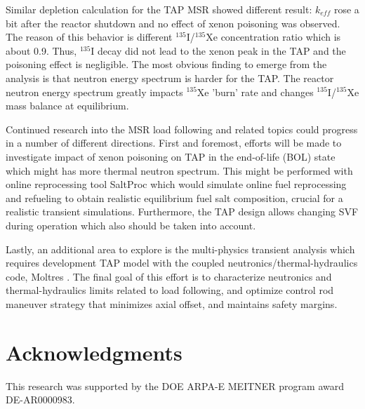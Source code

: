 \documentclass{anstrans}
\begin{document}
Similar depletion calculation for the \gls{TAP} \gls{MSR} showed different 
result: $k_{eff}$ rose a bit after the reactor shutdown and no effect of xenon 
poisoning was observed. The reason of this behavior is different 
$^{135}$I/$^{135}$Xe concentration ratio which is about 0.9. Thus, $^{135}$I 
decay did not lead to the xenon peak in the \gls{TAP} and the poisoning effect 
is negligible. The most obvious finding to emerge from the analysis is that 
neutron energy spectrum is harder for the \gls{TAP}. The reactor neutron energy
spectrum greatly impacts $^{135}$Xe 'burn' rate and changes 
$^{135}$I/$^{135}$Xe mass balance at equilibrium.

Continued research into the 	\gls{MSR} load following and related topics 
could 
progress
in a number of different directions. First and foremost, efforts will 
be made to investigate impact of xenon poisoning on \gls{TAP} in the 
end-of-life (BOL) state which might has more thermal neutron spectrum. This 
might be performed with online reprocessing tool SaltProc 
\cite{rykhlevskii_modeling_2019, rykhlevskii_arfc/saltproc_2018} which would 
simulate online fuel reprocessing and refueling to obtain realistic 
equilibrium fuel salt composition, crucial for a realistic transient 
simulations. Furthermore, the \gls{TAP} design allows changing \gls{SVF} 
during operation which also should be taken into account.

Lastly, an additional area to explore is the multi-physics transient analysis 
which
requires development \gls{TAP} model with the coupled 
neutronics/thermal-hydraulics code, Moltres \cite{lindsay_introduction_2018}. 
The final goal of this effort is to characterize neutronics and 
thermal-hydraulics limits related to load following, and optimize control rod 
maneuver strategy that minimizes axial offset, and maintains safety margins.
\section{Acknowledgments}
This research was supported by the DOE ARPA-E MEITNER program award 
DE-AR0000983.


\end{document}

